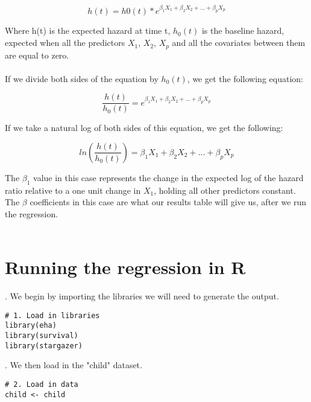 \documentclass[12pt,letterpaper]{article}
\begin{document}
\begin{equation}
h(t) = h0(t) * e^{\beta_{1}X_{1} + \beta_{2}X_{2} + ... + \beta_{p}X_{p}}
\end{equation}

\noindent 
Where h(t) is the expected hazard at time t, $h_0(t)$ is the baseline hazard, expected when all the predictors $X_1$, $X_2$, $X_p$ and all the covariates between them are equal to zero. 
\\\\

\noindent If we divide both sides of the equation by $h_0(t)$, we get the following equation:

\begin{equation}
\frac{h(t)}{h_0(t)} = e^{\beta_1X_1 + \beta_2X_2 + ... + \beta_pX_p}
\end{equation}

\noindent If we take a natural log of both sides of this equation, we get the following:

\begin{equation}
ln({\frac{h(t)}{h_0(t)}}) = \beta_1X_1 + \beta_2X_2 + ... + \beta_pX_p
\end{equation}

\noindent The $\beta_1$ value in this case represents the change in the expected log of the hazard ratio relative to a one unit change in $X_1$, holding all other predictors constant. The $\beta$ coefficients in this case are what our results table will give us, after we run the regression.
\\\\

\section{Running the regression in R}

. We begin by importing the libraries we will need to generate the output.
\\
\begin{lstlisting}
# 1. Load in libraries
library(eha)
library(survival)
library(stargazer)
\end{lstlisting}



. We then load in the "child" dataset.
\\
\begin{lstlisting}
# 2. Load in data
child <- child
\end{lstlisting}
\end{document}
